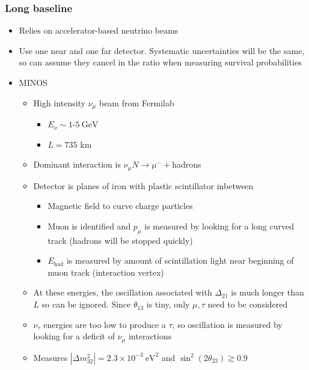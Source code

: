 \documentclass[11pt]{article}
\newcommand{\gev}{\text{GeV}}
\newcommand{\ev}{\text{eV}}
\begin{document}
\subsubsection{Long baseline}
\begin{itemize}
  \item Relies on accelerator-based neutrino beams
  \item Use one near and one far detector. Systematic uncertainties will be the same, so can assume they cancel in the ratio when measuring survival probabilities
  \item MINOS
  \begin{itemize}
    \item High intensity $\nu_\mu$ beam from Fermilab
    \begin{itemize}
      \item $E_\nu \sim 1\text{-}5~\gev$
      \item $L=735$ km
    \end{itemize}
    \item Dominant interaction is $\nu_\mu N\rightarrow\mu^-+$hadrons
    \item Detector is planes of iron with plastic scintillator inbetween
    \begin{itemize}
      \item Magnetic field to curve charge particles
      \item Muon is identified and $p_\mu$ is measured by looking for a long curved track (hadrons will be stopped quickly)
      \item $E_\text{had}$ is measured by amount of scintillation light near beginning of muon track (interaction vertex)
    \end{itemize}
    \item At these energies, the oscillation associated with $\Delta_{21}$ is much longer than $L$ so can be ignored. Since $\theta_{13}$ is tiny, only $\mu,\tau$ need to be considered
    \item $\nu_\tau$ energies are too low to produce a $\tau$, so oscillation is measured by looking for a deficit of $\nu_\mu$ interactions
    \item Measures $|\Delta m_{32}^2| = 2.3 \times 10^{-3}~\ev^2$ and $\sin^2(2\theta_{23})\gtrsim 0.9$
  \end{itemize}
\end{itemize}
\end{document}
